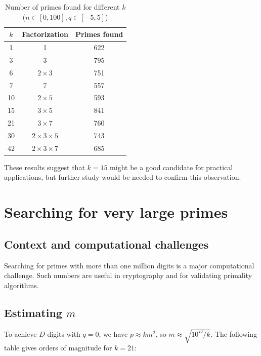 \documentclass[11pt,a4paper]{article}
\theoremstyle{definition}
\theoremstyle{plain}
\def\textbf#1{#1}%
\begin{document}
\begin{table}[H]
\centering
\caption{Number of primes found for different $k$ ($n \in [0, 100], q \in [-5, 5]$)}
\label{tab:comparison_k}
\begin{tabular}{@{}ccc@{}}
\toprule
\textbf{$k$} & \textbf{Factorization} & \textbf{Primes found} \\
\midrule
1 & 1 & 622 \\
3 & 3 & 795 \\
6 & $2 \times 3$ & 751 \\
7 & 7 & 557 \\
10 & $2 \times 5$ & 593 \\
15 & $3 \times 5$ & 841 \\
21 & $3 \times 7$ & 760 \\
30 & $2 \times 3 \times 5$ & 743 \\
42 & $2 \times 3 \times 7$ & 685 \\
\bottomrule
\end{tabular}
\end{table}

These results suggest that $k=15$ might be a good candidate for practical applications, but further study would be needed to confirm this observation.

\section{Searching for very large primes}

\subsection{Context and computational challenges}

Searching for primes with more than one million digits is a major computational challenge. Such numbers are useful in cryptography and for validating primality algorithms.

\subsection{Estimating $m$}

To achieve $D$ digits with $q=0$, we have $p \approx k m^2$, so $m \approx \sqrt{10^D / k}$. The following table gives orders of magnitude for $k=21$:
\end{document}
